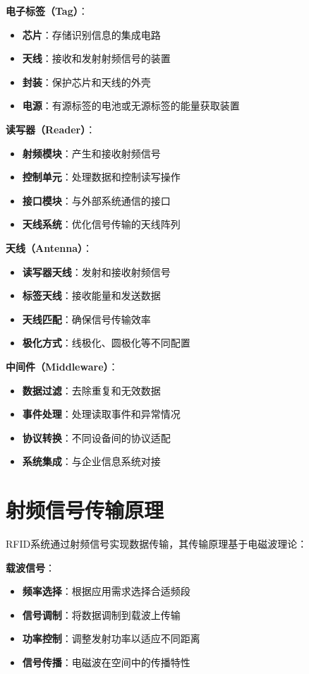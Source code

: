\documentclass[12pt,UTF8]{ctexbook}
\begin{document}
\textbf{电子标签（Tag）}：
\begin{itemize}[leftmargin=3.5em]
    \item \textbf{芯片}：存储识别信息的集成电路
    \item \textbf{天线}：接收和发射射频信号的装置
    \item \textbf{封装}：保护芯片和天线的外壳
    \item \textbf{电源}：有源标签的电池或无源标签的能量获取装置
\end{itemize}

\textbf{读写器（Reader）}：
\begin{itemize}[leftmargin=3.5em]
    \item \textbf{射频模块}：产生和接收射频信号
    \item \textbf{控制单元}：处理数据和控制读写操作
    \item \textbf{接口模块}：与外部系统通信的接口
    \item \textbf{天线系统}：优化信号传输的天线阵列
\end{itemize}

\textbf{天线（Antenna）}：
\begin{itemize}[leftmargin=3.5em]
    \item \textbf{读写器天线}：发射和接收射频信号
    \item \textbf{标签天线}：接收能量和发送数据
    \item \textbf{天线匹配}：确保信号传输效率
    \item \textbf{极化方式}：线极化、圆极化等不同配置
\end{itemize}

\textbf{中间件（Middleware）}：
\begin{itemize}[leftmargin=3.5em]
    \item \textbf{数据过滤}：去除重复和无效数据
    \item \textbf{事件处理}：处理读取事件和异常情况
    \item \textbf{协议转换}：不同设备间的协议适配
    \item \textbf{系统集成}：与企业信息系统对接
\end{itemize}

\section{射频信号传输原理}

RFID系统通过射频信号实现数据传输，其传输原理基于电磁波理论：

\textbf{载波信号}：
\begin{itemize}[leftmargin=3.5em]
    \item \textbf{频率选择}：根据应用需求选择合适频段
    \item \textbf{信号调制}：将数据调制到载波上传输
    \item \textbf{功率控制}：调整发射功率以适应不同距离
    \item \textbf{信号传播}：电磁波在空间中的传播特性
\end{itemize}
\end{document}
